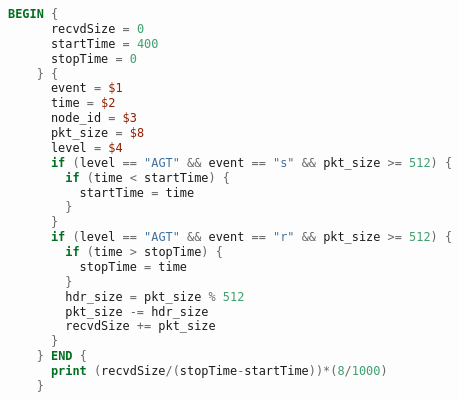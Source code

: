     \begin{lstlisting}[language=awk, style=mystyle, caption=AWK скрипт для подсчёта параметра Throughput]
    BEGIN {
      recvdSize = 0
      startTime = 400
      stopTime = 0
    } {
      event = $1
      time = $2
      node_id = $3
      pkt_size = $8
      level = $4
      if (level == "AGT" && event == "s" && pkt_size >= 512) {
        if (time < startTime) {
          startTime = time
        }
      }
      if (level == "AGT" && event == "r" && pkt_size >= 512) {
        if (time > stopTime) {
          stopTime = time
        }
        hdr_size = pkt_size % 512
        pkt_size -= hdr_size
        recvdSize += pkt_size
      }
    } END {
      print (recvdSize/(stopTime-startTime))*(8/1000)
    }
    \end{lstlisting}